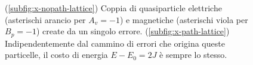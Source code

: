 \begin{figure}[!ht]
	\centering
	 \qquad \qquad
	\caption{(\ref{subfig:x-nopath-lattice}) Coppia di quasiparticle elettriche (asterischi arancio per $A_v = -1$) e magnetiche (asterischi viola per $B_p = -1$) create da un singolo errore. (\ref{subfig:x-path-lattice}) Indipendentemente dal cammino di errori che origina queste particelle, il costo di energia $E - E_0 = 2 J$ è sempre lo stesso.}
    \label{fig:x-equiv-lattice}
\end{figure}

